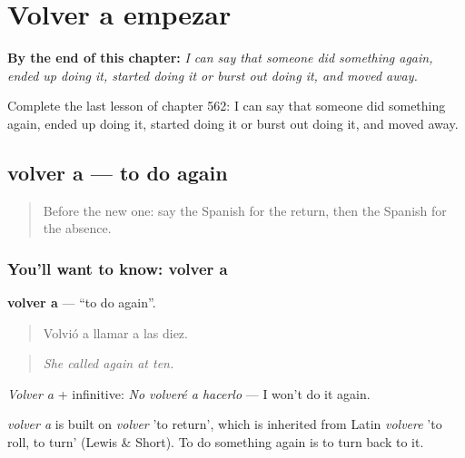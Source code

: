 
\chapter{Volver a empezar}
\label{ch:es-volver-a-empezar}

\begin{chapteropening}
\textbf{By the end of this chapter:} \emph{I can say that someone did something again, ended up doing it, started doing it or burst out doing it, and moved away.}

Complete the last lesson of chapter 562: I can say that someone did something again, ended up doing it, started doing it or burst out doing it, and moved away.
\end{chapteropening}

\section[volver a]{volver a — to do again}

\label{lesson:ES-C562-volver-a}



\begin{quote}
Before the new one: say the Spanish for the return, then the Spanish for the absence.
\end{quote}

\subsection*{You'll want to know: volver a}
\textbf{volver a} — \textquotedblleft{}to do again\textquotedblright{}.

\begin{quote}
Volvió a llamar a las diez.
\end{quote}

\begin{quote}
\emph{She called again at ten.}
\end{quote}

\emph{Volver a} + infinitive: \emph{No volveré a hacerlo} — I won't do it again.

\begin{cousinweb}
\emph{volver a} is built on \emph{volver} 'to return', which is inherited from Latin \emph{volvere} 'to roll, to turn' (Lewis \& Short). To do something again is to turn back to it.
\end{cousinweb}


